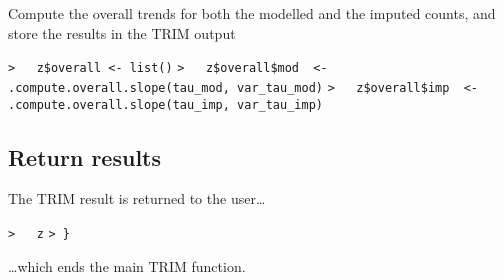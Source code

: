 \documentclass[a4paper]{article}
\begin{document}
Compute the overall trends for both the modelled and the imputed counts, and
store the results in the TRIM output\par
\verb~>   z$overall <- list()~\newline
\verb~>   z$overall$mod  <- .compute.overall.slope(tau_mod, var_tau_mod)~\newline
\verb~>   z$overall$imp  <- .compute.overall.slope(tau_imp, var_tau_imp)~\par



\subsection{Return results}\par

The TRIM result is returned to the user\ldots\par
\verb~>   z~\newline
\verb~> }~\par
\ldots which ends the main TRIM function.
\end{document}
